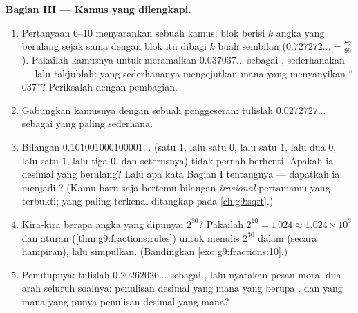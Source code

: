 \begin{problem}
\medskip
\noindent\textbf{Bagian III --- Kamus yang dilengkapi.}
\begin{enumerate}[resume]
  \item Pertanyaan 6--10 menyarankan sebuah kamus: blok berisi $k$
        angka yang berulang sejak  sama dengan blok
        itu dibagi $k$ buah sembilan ($0.727272\ldots = \frac{72}{99}$).
        Pakailah kamusnya untuk meramalkan $0.037037\ldots$ sebagai
        , sederhanakan --- lalu takjublah:  yang
        sederhananya mengejutkan mana yang menyanyikan ``$037$''?
        Periksalah dengan pembagian.
  \item Gabungkan kamusnya dengan sebuah penggeseran: tulislah
        $0.0272727\ldots$ sebagai  yang paling sederhana.
  \item Bilangan $0.101001000100001\ldots$ (satu $1$, lalu satu
        $0$, lalu satu $1$, lalu dua $0$, lalu satu $1$, lalu tiga
        $0$, dan seterusnya) tidak pernah berhenti. Apakah ia
        desimal yang berulang? Lalu apa kata Bagian I tentangnya
        --- dapatkah ia menjadi ? (Kamu baru saja bertemu
        bilangan \emph{irasional} pertamamu yang terbukti; yang
        paling terkenal ditangkap pada \cref{ch:g9:sqrt}.)
  \item Kira-kira berapa angka yang dipunyai $2^{30}$? Pakailah
        $2^{10} = 1\,024 \approx 1.024 \times 10^3$ dan aturan
         (\cref{thm:g9:fractions:rules}) untuk menulis
        $2^{30}$ dalam  (secara hampiran), lalu
        simpulkan. (Bandingkan \cref{exo:g9:fractions:10}.)
  \item Penutupnya: tulislah $0.20262026\ldots$ sebagai ,
        lalu nyatakan pesan moral dua arah seluruh soalnya:
        penulisan desimal yang mana yang berupa , dan
         yang mana yang punya penulisan desimal yang mana?

\end{enumerate}
\end{problem}
